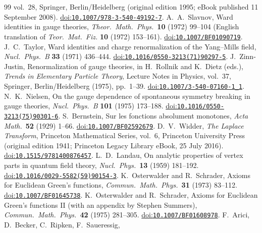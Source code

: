 \documentclass[final,5p,times,twocolumn,numbers,nopreprintline]{elsarticle}
\numberwithin{equation}{section}
\theoremstyle{definition}
\theoremstyle{remark}
\begin{document}
\begin{thebibliography}{99}
vol.~28, Springer, Berlin/Heidelberg (original edition 1995;
eBook published 11 September 2008).
\href{https://doi.org/10.1007/978-3-540-49192-7}{doi:\nolinkurl{10.1007/978-3-540-49192-7}}.
A.~A.~Slavnov,
Ward identities in gauge theories,
\emph{Theor.\ Math.\ Phys.}\ \textbf{10} (1972) 99--104
(English translation of \emph{Teor.\ Mat.\ Fiz.} \textbf{10}
(1972) 153--161).
\href{https://doi.org/10.1007/BF01090719}{doi:\nolinkurl{10.1007/BF01090719}}.
J.~C.~Taylor,
Ward identities and charge renormalization of the Yang--Mills field,
\emph{Nucl.\ Phys.\ B} \textbf{33} (1971) 436--444.
\href{https://doi.org/10.1016/0550-3213(71)90297-5}{doi:\nolinkurl{10.1016/0550-3213(71)90297-5}}.
J.~Zinn-Justin,
Renormalization of gauge theories,
in H.~Rollnik and K.~Dietz (eds.),
\emph{Trends in Elementary Particle Theory},
Lecture Notes in Physics, vol.~37, Springer, Berlin/Heidelberg
(1975), pp.~1--39.
\href{https://doi.org/10.1007/3-540-07160-1_1}{doi:\nolinkurl{10.1007/3-540-07160-1_1}}.
N.~K.~Nielsen,
On the gauge dependence of spontaneous symmetry breaking in gauge
theories, \emph{Nucl.\ Phys.\ B} \textbf{101} (1975) 173--188.
\href{https://doi.org/10.1016/0550-3213(75)90301-6}{doi:\nolinkurl{10.1016/0550-3213(75)90301-6}}.
S.~Bernstein,
Sur les fonctions absolument monotones,
\emph{Acta Math.}\ \textbf{52} (1929) 1--66.
\href{https://doi.org/10.1007/BF02592679}{doi:\nolinkurl{10.1007/BF02592679}}.
D.~V.~Widder,
\emph{The Laplace Transform}, Princeton Mathematical Series, vol.~6,
Princeton University Press (original edition 1941;
Princeton Legacy Library eBook, 25 July 2016).
\href{https://doi.org/10.1515/9781400876457}{doi:\nolinkurl{10.1515/9781400876457}}.
L.~D.~Landau,
On analytic properties of vertex parts in quantum field theory,
\emph{Nucl.\ Phys.}\ \textbf{13} (1959) 181--192.
\href{https://doi.org/10.1016/0029-5582(59)90154-3}{doi:\nolinkurl{10.1016/0029-5582(59)90154-3}}.
K.~Osterwalder and R.~Schrader,
Axioms for Euclidean Green's functions,
\emph{Commun.\ Math.\ Phys.}\ \textbf{31} (1973) 83--112.
\href{https://doi.org/10.1007/BF01645738}{doi:\nolinkurl{10.1007/BF01645738}}.
K.~Osterwalder and R.~Schrader,
Axioms for Euclidean Green's functions II
(with an appendix by Stephen Summers),
\emph{Commun.\ Math.\ Phys.}\ \textbf{42} (1975) 281--305.
\href{https://doi.org/10.1007/BF01608978}{doi:\nolinkurl{10.1007/BF01608978}}.
F.~Arici, D.~Becker, C.~Ripken, F.~Saueressig,

\end{thebibliography}
\end{document}
